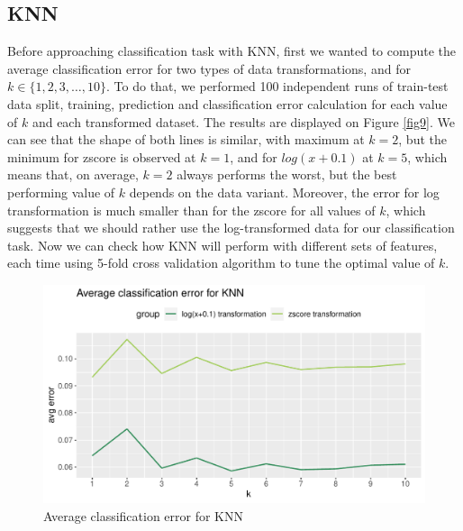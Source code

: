 \documentclass{article}\usepackage[]{graphicx}\usepackage[]{xcolor}
\makeatletter
\def\maxwidth{ %
  \ifdim\Gin@nat@width>\linewidth
    \linewidth
  \else
    \Gin@nat@width
  \fi
}
\newenvironment{knitrout}{}{} %
\makeatother
\begin{document}
\subsection*{KNN}

Before approaching classification task with KNN, first we wanted to compute the average classification error
for two types of data transformations, and for $k \in \{1, 2, 3, \dots, 10\}$.
To do that, we performed 100 independent runs of train-test data split, training, prediction
and classification error calculation for each value of $k$ and each transformed dataset.
The results are displayed on Figure \ref{fig9}. We can see that the shape of both lines is similar,
with maximum at $k=2$, but the minimum for zscore is observed at $k=1$, and for $log(x+0.1)$
at $k=5$, which means that, on average, $k=2$ always performs the worst, but the best performing
value of $k$ depends on the data variant. Moreover, the error for log transformation is much smaller 
than for the zscore for all values of $k$, which suggests that we should rather use the 
log-transformed data for our classification task. Now we can check how KNN will perform with different sets of features,
each time using 5-fold cross validation algorithm to tune the optimal value of $k$.

\begin{knitrout}
\color{fgcolor}\begin{figure}[h]
\includegraphics[width=\maxwidth]{figure/avgErrKNN-1} \caption[\label{fig9} Average classification error for KNN]{\label{fig9} Average classification error for KNN}\label{fig:avgErrKNN}
\end{figure}

\end{knitrout}
\end{document}
